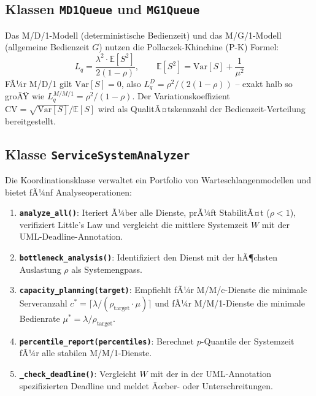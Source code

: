 ﻿\documentclass[a4paper,12pt]{report}
\theoremstyle{definition}
\begin{document}
\subsection{Klassen \texttt{MD1Queue} und \texttt{MG1Queue}}

Das M/D/1-Modell (deterministische Bedienzeit) und das M/G/1-Modell
(allgemeine Bedienzeit $G$) nutzen die Pollaczek-Khinchine (P-K) Formel:
\begin{equation}
	L_q = \frac{\lambda^2 \cdot \mathbb{E}[S^2]}{2(1-\rho)}, \qquad
	\mathbb{E}[S^2] = \mathrm{Var}[S] + \frac{1}{\mu^2}
\end{equation}
FÃ¼r M/D/1 gilt $\mathrm{Var}[S]=0$, also $L_q^{D} = \rho^2/(2(1-\rho))$
-- exakt halb so groÃŸ wie $L_q^{M/M/1} = \rho^2/(1-\rho)$.
Der Variationskoeffizient $\mathrm{CV} = \sqrt{\mathrm{Var}[S]} / \mathbb{E}[S]$
wird als QualitÃ¤tskennzahl der Bedienzeit-Verteilung bereitgestellt.

\subsection{Klasse \texttt{ServiceSystemAnalyzer}}

Die Koordinationsklasse verwaltet ein Portfolio von Warteschlangenmodellen
und bietet fÃ¼nf Analyseoperationen:

\begin{enumerate}
	\item[-] \textbf{\texttt{analyze\_all()}}: Iteriert Ã¼ber alle Dienste,
	prÃ¼ft StabilitÃ¤t ($\rho < 1$), verifiziert Little's Law und
	vergleicht die mittlere Systemzeit $W$ mit der UML-Deadline-Annotation.
	\item[-] \textbf{\texttt{bottleneck\_analysis()}}: Identifiziert den
	Dienst mit der hÃ¶chsten Auslastung $\rho$ als Systemengpass.
	\item[-] \textbf{\texttt{capacity\_planning(target)}}:
	Empfiehlt fÃ¼r M/M/c-Dienste die minimale Serveranzahl
	$c^* = \lceil \lambda / (\rho_\text{target} \cdot \mu) \rceil$
	und fÃ¼r M/M/1-Dienste die minimale Bedienrate
	$\mu^* = \lambda / \rho_\text{target}$.
	\item[-] \textbf{\texttt{percentile\_report(percentiles)}}:
	Berechnet $p$-Quantile der Systemzeit fÃ¼r alle stabilen M/M/1-Dienste.
	\item[-] \textbf{\texttt{\_check\_deadline()}}: Vergleicht $W$ mit der
	in der UML-Annotation spezifizierten Deadline und meldet Ãœber- oder
	Unterschreitungen.
\end{enumerate}
\end{document}
